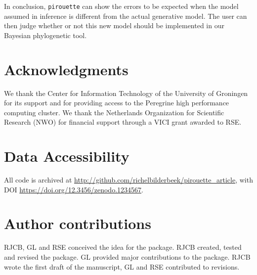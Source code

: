 In conclusion, \verb;pirouette; can show the errors to be expected
when the model assumed in inference is different from the 
actual generative model.
The user can then judge whether or not this new model 
should be implemented in our Bayesian phylogenetic tool. 

\section{Acknowledgments}

We thank the Center for Information Technology of the University 
of Groningen for its support and for providing access to the Peregrine 
high performance computing cluster. 
We thank the Netherlands 
Organization for Scientific Research (NWO) for financial support 
through a VICI grant awarded to RSE.

\section{Data Accessibility}

All code is archived at 
\url{http://github.com/richelbilderbeek/pirouette_article},
with DOI \url{https://doi.org/12.3456/zenodo.1234567}.

\section{Author contributions}

RJCB, GL and RSE conceived the idea for the package. 
RJCB created, tested and revised the package.
GL provided major contributions to the package.
RJCB wrote the first draft of the manuscript, 
GL and RSE contributed to revisions.




